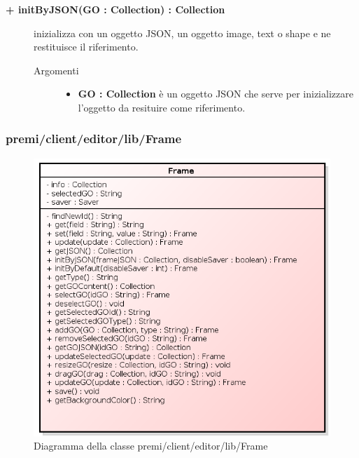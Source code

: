 \begin{description}
\begin{description}
\end{description}

	\begin{description}
		\item[\textbf{\color{blue}+ initByJSON(GO : Collection) : Collection			}] \hfill
			inizializza con un oggetto JSON, un oggetto image, text o shape e ne restituisce il riferimento.
			
		\begin{description}
			\item[Argomenti] \hfill
				\begin{itemize}
				
					\item \textbf{GO : Collection			} \hfill
					è un oggetto JSON che serve per inizializzare l'oggetto da resituire come riferimento.
				\end{itemize}
		\end{description}

\end{description}

\end{description}

\subsubsection{premi/client/editor/lib/Frame}
\begin{figure}[H]
\begin{center}
\includegraphics[scale=0.80]{img/diacla/frame.png}
\caption{Diagramma della classe premi/client/editor/lib/Frame}
\end{center}
\end{figure}

